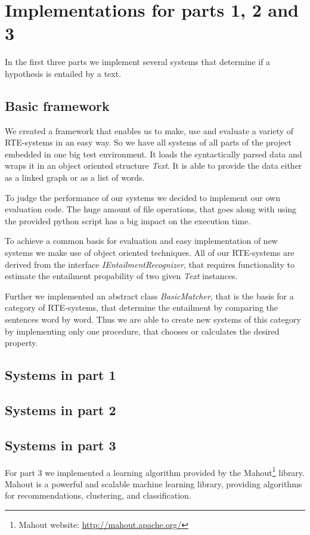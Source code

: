 
\section{Implementations for parts 1, 2 and 3}

In the first three parts we implement several systems that determine if 
a hypothesis is entailed by a text.


\subsection{Basic framework}

We created a framework that enables us to make, use and evaluate
a variety of RTE-systems in an easy way. So we have all systems of all parts
of the project embedded in one big test environment.
It loads the syntactically parsed data and wraps it in an object oriented structure 
\textit{Text}. It is able to provide the data either as a linked graph or as a 
list of words.

To judge the performance of our systems we decided to implement our own evaluation
code. The huge amount of file operations, that goes along with using the provided 
python script has a big impact on the execution time.

To achieve a common basis for evaluation and easy implementation of new systems we make use of 
object oriented techniques. All of our RTE-systems are derived from the interface
\textit{IEntailmentRecognizer}, that requires functionality to estimate the entailment
propability of two given \textit{Text} instances.

Further we implemented an abstract class \textit{BasicMatcher}, that is the basis for a
category of RTE-systems, that determine the entailment by comparing the sentences word by word.
Thus we are able to create new systems of this category by implementing only one procedure, 
that chooses or calculates the desired property.

\subsection{Systems in part 1}
\subsection{Systems in part 2}
\subsection{Systems in part 3}
For part 3 we implemented a learning algorithm provided by the Mahout\footnote{Mahout website:
\url{http://mahout.apache.org/}} library. Mahout is a powerful and scalable machine learning library, providing
algorithms for recommendations, clustering, and classification.

